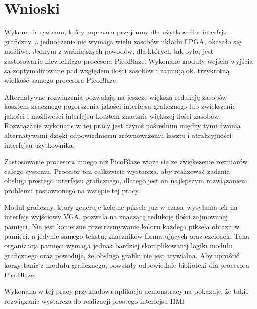 
\rozdzial
\section{Wnioski}
	

Wykonanie systemu, który zapewnia przyjemny dla użytkownika interfejs graficzny, a jednoczenie nie wymaga wielu zasobów układu FPGA, okazało się możliwe. Jednym z ważniejszych powodów, dla których tak było, jest zastosowanie niewielkiego procesora PicoBlaze. Wykonane moduły wejścia-wyjścia są zoptymalizowane pod względem ilości zasobów i zajmują ok. trzykrotną wielkość samego procesora PicoBlaze.

Alternatywne rozwiązania pozwalają na jeszcze większą redukcję zasobów kosztem znacznego pogorszenia jakości interfejsu graficznego lub zwiększenie jakości i możliwości interfejsu kosztem znacznie większej ilości zasobów. Rozwiązanie wykonane w tej pracy jest czymś pośrednim między tymi dwoma alternatywami dzięki odpowiedniemu zrównoważeniu kosztu i atrakcyjności interfejsu użytkownika.

Zastosowanie procesora innego niż PicoBlaze wiąże się ze zwiększenie rozmiarów całego systemu. Procesor ten całkowicie wystarcza, aby realizować zadania obsługi prostego interfejsu graficznego, dlatego jest on najlepszym rozwiązaniem problemu postawionego na wstępie tej pracy.

Moduł graficzny, który generuje kolejne piksele już w czasie wysyłania ich na interfejs wyjściowy VGA, pozwala na znaczącą redukcję ilości zajmowanej pamięci. Nie jest konieczne przetrzymywanie koloru każdego piksela obrazu w pamięci, a jedynie samego tekstu, znaczników formatujących oraz czcionek. Taka organizacja pamięci wymaga jednak bardziej skomplikowanej logiki modułu graficznego oraz powoduje, że obsługa grafiki nie jest trywialna. Aby uprościć korzystanie z modułu graficznego, powstały odpowiednie biblioteki dla procesora PicoBlaze.

Wykonana w tej pracy przykładowa aplikacja demonstracyjna pokazuje, że takie rozwiązanie wystarcza do realizacji prostego interfejsu HMI.

	
	


